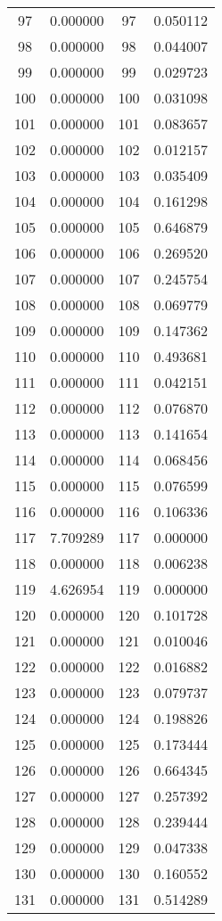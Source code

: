 \documentclass[12pt]{article}
\begin{document}
\begin{longtable}{@{}cccc@{}}
97 & 0.000000 & 97 & 0.050112 \\
98 & 0.000000 & 98 & 0.044007 \\
99 & 0.000000 & 99 & 0.029723 \\
100 & 0.000000 & 100 & 0.031098 \\
101 & 0.000000 & 101 & 0.083657 \\
102 & 0.000000 & 102 & 0.012157 \\
103 & 0.000000 & 103 & 0.035409 \\
104 & 0.000000 & 104 & 0.161298 \\
105 & 0.000000 & 105 & 0.646879 \\
106 & 0.000000 & 106 & 0.269520 \\
107 & 0.000000 & 107 & 0.245754 \\
108 & 0.000000 & 108 & 0.069779 \\
109 & 0.000000 & 109 & 0.147362 \\
110 & 0.000000 & 110 & 0.493681 \\
111 & 0.000000 & 111 & 0.042151 \\
112 & 0.000000 & 112 & 0.076870 \\
113 & 0.000000 & 113 & 0.141654 \\
114 & 0.000000 & 114 & 0.068456 \\
115 & 0.000000 & 115 & 0.076599 \\
116 & 0.000000 & 116 & 0.106336 \\
117 & 7.709289 & 117 & 0.000000 \\
118 & 0.000000 & 118 & 0.006238 \\
119 & 4.626954 & 119 & 0.000000 \\
120 & 0.000000 & 120 & 0.101728 \\
121 & 0.000000 & 121 & 0.010046 \\
122 & 0.000000 & 122 & 0.016882 \\
123 & 0.000000 & 123 & 0.079737 \\
124 & 0.000000 & 124 & 0.198826 \\
125 & 0.000000 & 125 & 0.173444 \\
126 & 0.000000 & 126 & 0.664345 \\
127 & 0.000000 & 127 & 0.257392 \\
128 & 0.000000 & 128 & 0.239444 \\
129 & 0.000000 & 129 & 0.047338 \\
130 & 0.000000 & 130 & 0.160552 \\
131 & 0.000000 & 131 & 0.514289 \\

\end{longtable}
\end{document}
